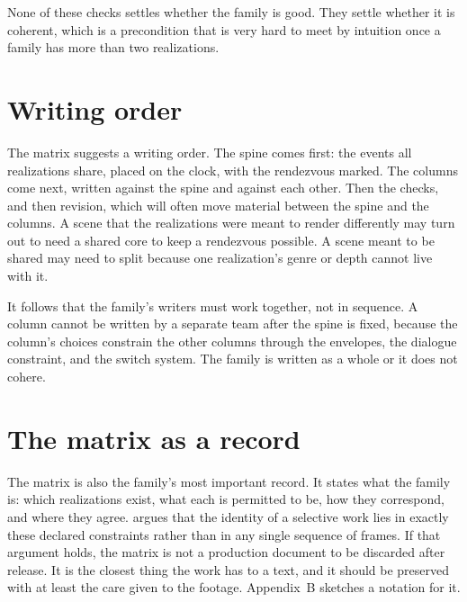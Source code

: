 None of these checks settles whether the family is good. They settle whether it is coherent, which is a precondition that is very hard to meet by intuition once a family has more than two realizations.

\section{Writing order}

The matrix suggests a writing order. The spine comes first: the events all realizations share, placed on the clock, with the rendezvous marked. The columns come next, written against the spine and against each other. Then the checks, and then revision, which will often move material between the spine and the columns. A scene that the realizations were meant to render differently may turn out to need a shared core to keep a rendezvous possible. A scene meant to be shared may need to split because one realization's genre or depth cannot live with it.

It follows that the family's writers must work together, not in sequence. A column cannot be written by a separate team after the spine is fixed, because the column's choices constrain the other columns through the envelopes, the dialogue constraint, and the switch system. The family is written as a whole or it does not cohere.

\section{The matrix as a record}

The matrix is also the family's most important record. It states what the family is: which realizations exist, what each is permitted to be, how they correspond, and where they agree.  argues that the identity of a selective work lies in exactly these declared constraints rather than in any single sequence of frames. If that argument holds, the matrix is not a production document to be discarded after release. It is the closest thing the work has to a text, and it should be preserved with at least the care given to the footage. Appendix~B sketches a notation for it.
